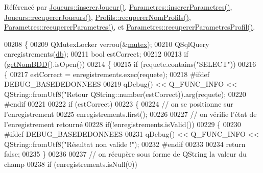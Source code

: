 Référencé par \hyperlink{class_joueurs_ad41325dbd0611773c6e9fd8a814be1b3}{Joueurs\+::inserer\+Joueur()}, \hyperlink{class_parametres_a0102cadfb1bce5a8e82d6c12661fccf8}{Parametres\+::inserer\+Parametres()}, \hyperlink{class_joueurs_a5bd70438c6624d8dca765e322285eb61}{Joueurs\+::recuperer\+Joueurs()}, \hyperlink{class_profils_afe85f77aead9a7ea2f09f676d6e2c663}{Profils\+::recuperer\+Nom\+Profils()}, \hyperlink{class_parametres_a853872796d32655f3f1ffc090b6d076a}{Parametres\+::recuperer\+Parametres()}, et \hyperlink{class_parametres_ac91b8cb3a293f27eeb7d87673889de15}{Parametres\+::recuperer\+Parametres\+Profil()}.


\begin{DoxyCode}
00208 \{
00209     QMutexLocker verrou(&\hyperlink{class_base_de_donnees_aa1b4696fac87a740f914aa73739086f2}{mutex});
00210     QSqlQuery enregistrements(\hyperlink{class_base_de_donnees_a3e738dcf443370c46a541677ab619f06}{db});
00211     \textcolor{keywordtype}{bool} estCorrect;
00212 
00213     \textcolor{keywordflow}{if} (\hyperlink{class_base_de_donnees_a467909531ae3cdebaf173f6e97cdc624}{getNomBDD}().isOpen())
00214     \{
00215         \textcolor{keywordflow}{if} (requete.contains(\textcolor{stringliteral}{"SELECT"}))
00216         \{
00217             estCorrect = enregistrements.exec(requete);
00218 \textcolor{preprocessor}{            #ifdef DEBUG\_BASEDEDONNEES}
00219             qDebug() << Q\_FUNC\_INFO << QString::fromUtf8(\textcolor{stringliteral}{"Retour %
      QString::number(estCorrect)).arg(requete);
00220 \textcolor{preprocessor}{            #endif}
00221 
00222             \textcolor{keywordflow}{if} (estCorrect)
00223             \{
00224                 \textcolor{comment}{// on se positionne sur l'enregistrement}
00225                 enregistrements.first();
00226 
00227                 \textcolor{comment}{// on vérifie l'état de l'enregistrement retourné}
00228                 \textcolor{keywordflow}{if}(!enregistrements.isValid())
00229                 \{
00230 \textcolor{preprocessor}{                    #ifdef DEBUG\_BASEDEDONNEES}
00231                     qDebug() << Q\_FUNC\_INFO << QString::fromUtf8(\textcolor{stringliteral}{"Résultat non valide !"});
00232 \textcolor{preprocessor}{                    #endif}
00233 
00234                     \textcolor{keywordflow}{return} \textcolor{keyword}{false};
00235                 \}
00236 
00237                 \textcolor{comment}{// on récupère sous forme de QString la valeur du champ}
00238                 \textcolor{keywordflow}{if} (enregistrements.isNull(0))
}
\end{DoxyCode}
